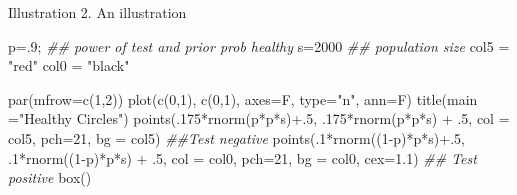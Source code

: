 \documentclass[
  11pt,
  ignorenonframetext,
]{beamer}
\newenvironment{Shaded}{\begin{snugshade}}{\end{snugshade}}
\newcommand{\AttributeTok}[1]{\textcolor[rgb]{0.40,0.45,0.13}{#1}}
\newcommand{\DecValTok}[1]{\textcolor[rgb]{0.68,0.00,0.00}{#1}}
\newcommand{\DocumentationTok}[1]{\textcolor[rgb]{0.37,0.37,0.37}{\textit{#1}}}
\newcommand{\FloatTok}[1]{\textcolor[rgb]{0.68,0.00,0.00}{#1}}
\newcommand{\FunctionTok}[1]{\textcolor[rgb]{0.28,0.35,0.67}{#1}}
\newcommand{\NormalTok}[1]{\textcolor[rgb]{0.00,0.23,0.31}{#1}}
\newcommand{\OtherTok}[1]{\textcolor[rgb]{0.00,0.23,0.31}{#1}}
\newcommand{\SpecialCharTok}[1]{\textcolor[rgb]{0.37,0.37,0.37}{#1}}
\newcommand{\StringTok}[1]{\textcolor[rgb]{0.13,0.47,0.30}{#1}}
\begin{document}
\begin{frame}[fragile]{Illustration 2. An illustration}
\protect\hypertarget{illustration-2.-an-illustration}{}
\begin{Shaded}
\begin{Highlighting}[]
\NormalTok{  p}\OtherTok{=}\NormalTok{.}\DecValTok{9}\NormalTok{; }\DocumentationTok{\#\# power of test and prior prob healthy}
\NormalTok{  s}\OtherTok{=}\DecValTok{2000}  \DocumentationTok{\#\# population size}
\NormalTok{  col5 }\OtherTok{=} \StringTok{"red"}
\NormalTok{  col0 }\OtherTok{=} \StringTok{"black"}

  \FunctionTok{par}\NormalTok{(}\AttributeTok{mfrow=}\FunctionTok{c}\NormalTok{(}\DecValTok{1}\NormalTok{,}\DecValTok{2}\NormalTok{))}
    \FunctionTok{plot}\NormalTok{(}\FunctionTok{c}\NormalTok{(}\DecValTok{0}\NormalTok{,}\DecValTok{1}\NormalTok{), }\FunctionTok{c}\NormalTok{(}\DecValTok{0}\NormalTok{,}\DecValTok{1}\NormalTok{), }\AttributeTok{axes=}\NormalTok{F, }\AttributeTok{type=}\StringTok{"n"}\NormalTok{, }\AttributeTok{ann=}\NormalTok{F)}
    \FunctionTok{title}\NormalTok{(}\AttributeTok{main =}\StringTok{"Healthy Circles"}\NormalTok{)}
    \FunctionTok{points}\NormalTok{(.}\DecValTok{175}\SpecialCharTok{*}\FunctionTok{rnorm}\NormalTok{(p}\SpecialCharTok{*}\NormalTok{p}\SpecialCharTok{*}\NormalTok{s)}\SpecialCharTok{+}\NormalTok{.}\DecValTok{5}\NormalTok{, .}\DecValTok{175}\SpecialCharTok{*}\FunctionTok{rnorm}\NormalTok{(p}\SpecialCharTok{*}\NormalTok{p}\SpecialCharTok{*}\NormalTok{s) }\SpecialCharTok{+}\NormalTok{ .}\DecValTok{5}\NormalTok{, }\AttributeTok{col =}\NormalTok{ col5, }\AttributeTok{pch=}\DecValTok{21}\NormalTok{, }\AttributeTok{bg =}\NormalTok{ col5) }\DocumentationTok{\#\#Test negative}
    \FunctionTok{points}\NormalTok{(.}\DecValTok{1}\SpecialCharTok{*}\FunctionTok{rnorm}\NormalTok{((}\DecValTok{1}\SpecialCharTok{{-}}\NormalTok{p)}\SpecialCharTok{*}\NormalTok{p}\SpecialCharTok{*}\NormalTok{s)}\SpecialCharTok{+}\NormalTok{.}\DecValTok{5}\NormalTok{, .}\DecValTok{1}\SpecialCharTok{*}\FunctionTok{rnorm}\NormalTok{((}\DecValTok{1}\SpecialCharTok{{-}}\NormalTok{p)}\SpecialCharTok{*}\NormalTok{p}\SpecialCharTok{*}\NormalTok{s) }\SpecialCharTok{+}\NormalTok{ .}\DecValTok{5}\NormalTok{, }\AttributeTok{col =}\NormalTok{ col0, }\AttributeTok{pch=}\DecValTok{21}\NormalTok{, }\AttributeTok{bg =}\NormalTok{ col0, }\AttributeTok{cex=}\FloatTok{1.1}\NormalTok{) }\DocumentationTok{\#\# Test positive}
    \FunctionTok{box}\NormalTok{()}
  

\end{Highlighting}
\end{Shaded}
\end{frame}
\end{document}
